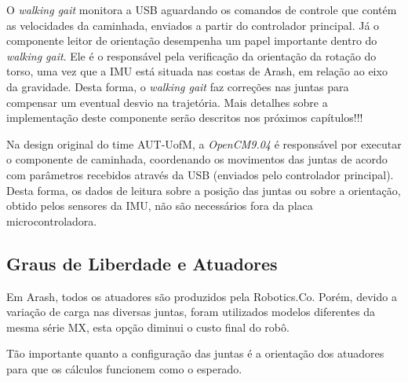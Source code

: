 O \textit{walking gait} monitora a USB aguardando os comandos de controle que contém as velocidades da caminhada, enviados a partir do controlador principal. Já o componente leitor de orientação desempenha um papel importante dentro do \textit{walking gait}. Ele é o responsável pela verificação da orientação da rotação do torso, uma vez que a IMU está situada nas costas de Arash, em relação ao eixo da gravidade. Desta forma, o \textit{walking gait} faz correções nas juntas para compensar um eventual desvio na trajetória. Mais detalhes sobre a implementação deste componente serão descritos nos próximos capítulos!!!

Na design original do time AUT-UofM, a \textit{OpenCM9.04} é responsável por executar o componente de caminhada, coordenando os movimentos das juntas de acordo com parâmetros recebidos através da USB (enviados pelo controlador principal). Desta forma, os dados de leitura sobre a posição das juntas ou sobre a orientação, obtido pelos sensores da IMU, não são necessários fora da placa microcontroladora.

\subsection{Graus de Liberdade e Atuadores}

Em Arash, todos os atuadores são produzidos pela Robotics.Co. Porém, devido a variação de carga nas diversas juntas, foram utilizados modelos diferentes da mesma série MX, esta opção diminui o custo final do robô.

Tão importante quanto a configuração das juntas é a orientação dos atuadores para que os cálculos funcionem como o esperado.

